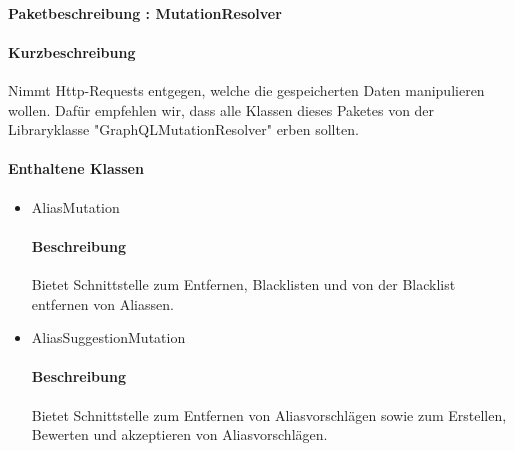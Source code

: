 \paragraph{Paketbeschreibung : MutationResolver}%
\paragraph*{Kurzbeschreibung}
Nimmt Http-Requests entgegen, welche die gespeicherten Daten manipulieren wollen.
Dafür empfehlen wir, dass alle Klassen dieses Paketes von der Libraryklasse "GraphQLMutationResolver" erben sollten.
\paragraph*{Enthaltene Klassen}
\begin{itemize}
    \item AliasMutation
    		\paragraph*{Beschreibung}
            Bietet Schnittstelle zum Entfernen, Blacklisten und von der Blacklist entfernen von Aliassen.
    \item AliasSuggestionMutation
    		\paragraph*{Beschreibung}
    		Bietet Schnittstelle zum Entfernen von Aliasvorschlägen sowie zum Erstellen, Bewerten und akzeptieren von Aliasvorschlägen.
\end{itemize}